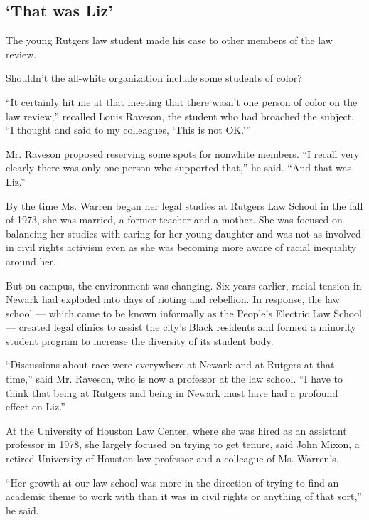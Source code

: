 \hypertarget{that-was-liz}{%
\subsection{`That was Liz'}\label{that-was-liz}}

The young Rutgers law student made his case to other members of the law
review.

Shouldn't the all-white organization include some students of color?

``It certainly hit me at that meeting that there wasn't one person of
color on the law review,'' recalled Louis Raveson, the student who had
broached the subject. ``I thought and said to my colleagues, `This is
not OK.'''

Mr. Raveson proposed reserving some spots for nonwhite members. ``I
recall very clearly there was only one person who supported that,'' he
said. ``And that was Liz.''

By the time Ms. Warren began her legal studies at Rutgers Law School in
the fall of 1973, she was married, a former teacher and a mother. She
was focused on balancing her studies with caring for her young daughter
and was not as involved in civil rights activism even as she was
becoming more aware of racial inequality around her.

But on campus, the environment was changing. Six years earlier, racial
tension in Newark had exploded into days of
\href{https://www.nytimes3xbfgragh.onion/2017/07/11/nyregion/newark-riots-50-years.html}{rioting
and rebellion}. In response, the law school --- which came to be known
informally as the People's Electric Law School --- created legal clinics
to assist the city's Black residents and formed a minority student
program to increase the diversity of its student body.

``Discussions about race were everywhere at Newark and at Rutgers at
that time,'' said Mr. Raveson, who is now a professor at the law school.
``I have to think that being at Rutgers and being in Newark must have
had a profound effect on Liz.''

At the University of Houston Law Center, where she was hired as an
assistant professor in 1978, she largely focused on trying to get
tenure, said John Mixon, a retired University of Houston law professor
and a colleague of Ms. Warren's.

``Her growth at our law school was more in the direction of trying to
find an academic theme to work with than it was in civil rights or
anything of that sort,'' he said.

